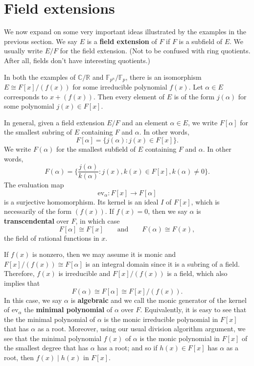 \documentclass{article}
\def\R{{\mathbb R}}
\def\F{{\mathbb F}}
\def\F{{\mathbb F}}
\def\C{{\mathbb C}}
\begin{document}
\section{Field extensions}

We now expand on some very important ideas illustrated by the examples in the previous section. We say $E$ is a \textbf{field extension} of $F$ if $F$ is a subfield of $E$. We usually write $E/F$ for the field extension. (Not to be confused with ring quotients. After all, fields don't have interesting quotients.) 

In both the examples of $\C/\R$ and $\F_{p^n}/\F_p$, there is an isomorphism $E\cong F[x]/(f(x))$ for some irreducible polynomial $f(x)$. Let $\alpha\in E$ corresponds to $x + (f(x))$. Then every element of $E$ is of the form $j(\alpha)$ for some polynomial $j(x)\in F[x]$.

In general, given a field extension $E/F$ and an element $\alpha\in E$, we write $F[\alpha]$ for the smallest subring of $E$ containing $F$ and $\alpha$. In other words,
$$F[\alpha] = \{j(\alpha)\colon j(x)\in F[x]\}.$$
We write $F(\alpha)$ for the smallest subfield of $E$ containing $F$ and $\alpha$. In other words,
$$F(\alpha) = \Big\{\frac{j(\alpha)}{k(\alpha)}\colon j(x),k(x)\in F[x],k(\alpha)\neq 0\Big\}.$$
The evaluation map $$\text{ev}_\alpha:F[x]\rightarrow F[\alpha]$$ is a surjective homomorphism. Its kernel is an ideal $I$ of $F[x]$, which is necessarily of the form $(f(x))$. If $f(x) = 0$, then we say $\alpha$ is \textbf{transcendental} over $F$, in which case $$F[\alpha]\cong F[x]\qquad\mbox{and}\qquad F(\alpha)\cong F(x),$$ the field of rational functions in $x$. 

If $f(x)$ is nonzero, then we may assume it is monic and $F[x]/(f(x))\cong F[\alpha]$ is an integral domain since it is a subring of a field. Therefore, $f(x)$ is irreducible and $F[x]/(f(x))$ is a field, which also implies that $$F(\alpha) \cong F[\alpha] \cong F[x]/(f(x)).$$ In this case, we say $\alpha$ is \textbf{algebraic} and we call the monic generator of the kernel of $\text{ev}_\alpha$ the \textbf{minimal polynomial} of $\alpha$ over $F$. Equivalently, it is easy to see that the the minimal polynomial of $\alpha$ is the monic irreducible polynomial in $F[x]$ that has $\alpha$ as a root. Moreover, using our usual division algorithm argument, we see that the minimal polynomial $f(x)$ of $\alpha$ is the monic polynomial in $F[x]$ of the smallest degree that has $\alpha$ has a root; and so if $h(x)\in F[x]$ has $\alpha$ as a root, then $f(x)\mid h(x)$ in $F[x]$. 
\end{document}
